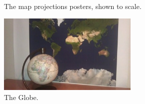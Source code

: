 \documentclass[a4paper,12pt]{article}
\begin{document}
\begin{figure}[h]
\begin{center}

\caption{The map projections posters, shown to scale.}
\end{center}
\end{figure}
\begin{figure}[h]
\begin{center}
\includegraphics[width=0.6\textwidth]{globe.jpg}
\caption{The Globe.}
\end{center}
\end{figure}
\end{document}
